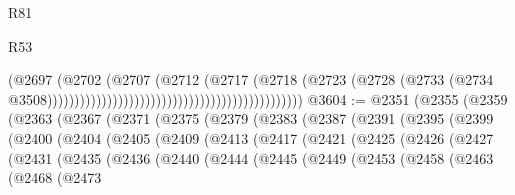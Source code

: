 \begin{lexlean}{R81}
\begin{lexlean}{R53}
\begin{coremodule}
{{{{{{{{{{{{{{{{{{{{{{{{{{{{{{{{{{{{{{{{{{{{{{{{{{{{{{{{{{{{{{{{{{{{{{{{{{{{{{{{{{{{{{{{{{{{{{{{{{{{{{{{{{{{{{{{                                                                              (@2697
                                                                                (@2702
                                                                                  (@2707
                                                                                    (@2712
                                                                                      (@2717
                                                                                        (@2718
                                                                                          (@2723
                                                                                            (@2728
                                                                                              (@2733
                                                                                                (@2734
                                                                                                  @3508)))))))))))))))))))))))))))))))))))))))))))))))
@3604 := @2351
    (@2355
      (@2359
        (@2363
          (@2367
            (@2371
              (@2375
                (@2379
                  (@2383
                    (@2387
                      (@2391
                        (@2395
                          (@2399
                            (@2400
                              (@2404
                                (@2405
                                  (@2409
                                    (@2413
                                      (@2417
                                        (@2421
                                          (@2425
                                            (@2426
                                              (@2427
                                                (@2431
                                                  (@2435
                                                    (@2436
                                                      (@2440
                                                        (@2444
                                                          (@2445
                                                            (@2449
                                                              (@2453
                                                                (@2458
                                                                  (@2463
                                                                    (@2468
                                                                      (@2473
}}}}}}}}}}}}}}}}}}}}}}}}}}}}}}}}}}}}}}}}}}}}}}}}}}}}}}}}}}}}}}}}}}}}}}}}}}}}}}}}}}}}}}}}}}}}}}}}}}}}}}}}}}}}}}}}
\end{coremodule}
\end{lexlean}
\end{lexlean}
